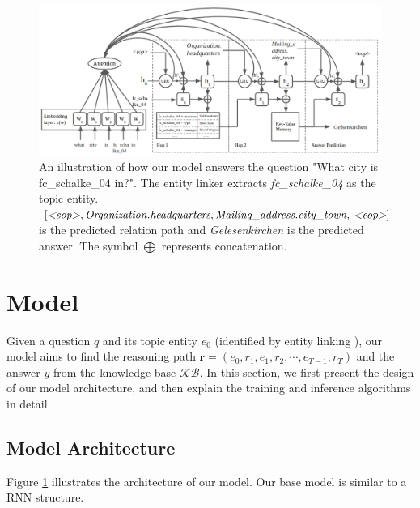 \begin{figure}[t]
\includegraphics[width=2.1\columnwidth]{figs/model2.png}
\caption{\fontsize{10}{12}\selectfont An illustration of how our model answers the question "What city is fc\_schalke\_04 in?". The entity linker extracts \textit{fc\_schalke\_04} as the topic entity. $[\textit{\textless sop\textgreater}, \textit{Organization.headquarters} , \textit{Mailing\_address.city\_town, \textless eop\textgreater}]$ is the predicted relation path  and \textit{Gelesenkirchen} is the predicted answer. The symbol $\bigoplus$ represents concatenation. }
\label{fig:model}
\end{figure}


\section{Model}
 Given a question $q$ and its topic entity $e_0$ (identified by entity linking ), our model aims to find the reasoning path $\mathbf{r} = (e_{0},r_{1},e_{1},r_{2}, \cdots,e_{T-1}, r_{T})$ and the answer $y$ from the knowledge base $\mathcal{KB}$. In this section, we first present the design of our model architecture, and then explain the training and inference algorithms in detail.  

\subsection{Model Architecture}


Figure \ref{fig:model} illustrates the architecture of our model. Our base model is similar to a RNN structure.

